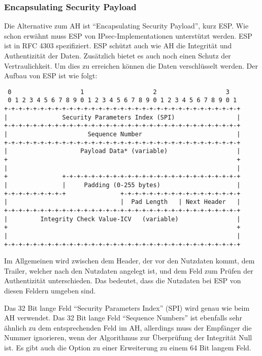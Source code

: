 \documentclass[12pt]{scrartcl}
\begin{document}
\subsubsection{Encapsulating Security Payload}
Die Alternative zum AH ist "`Encapsulating Security Payload"', kurz ESP. Wie schon erwähnt muss ESP von IPsec-Implementationen unterstützt werden. ESP ist in RFC 4303 spezifiziert.\cite{RFC4303}
ESP schützt auch wie AH die Integrität und Authentizität der Daten. Zusätzlich bietet es auch noch einen Schutz der Vertraulichkeit. Um dies zu erreichen können die Daten verschlüsselt werden. Der Aufbau von ESP ist wie folgt:

\begin{addmargin}[-1em]{0em}
\begin{verbatim}
 0                   1                   2                   3
 0 1 2 3 4 5 6 7 8 9 0 1 2 3 4 5 6 7 8 9 0 1 2 3 4 5 6 7 8 9 0 1
+-+-+-+-+-+-+-+-+-+-+-+-+-+-+-+-+-+-+-+-+-+-+-+-+-+-+-+-+-+-+-+-+ 
|               Security Parameters Index (SPI)                 | 
+-+-+-+-+-+-+-+-+-+-+-+-+-+-+-+-+-+-+-+-+-+-+-+-+-+-+-+-+-+-+-+-+ 
|                      Sequence Number                          | 
+-+-+-+-+-+-+-+-+-+-+-+-+-+-+-+-+-+-+-+-+-+-+-+-+-+-+-+-+-+-+-+-+ 
|                    Payload Data* (variable)                   | 
+                                                               + 
|                                                               | 
+               +-+-+-+-+-+-+-+-+-+-+-+-+-+-+-+-+-+-+-+-+-+-+-+-+
|               |     Padding (0-255 bytes)                     |
+-+-+-+-+-+-+-+-+               +-+-+-+-+-+-+-+-+-+-+-+-+-+-+-+-+
|                               |  Pad Length   | Next Header   |
+-+-+-+-+-+-+-+-+-+-+-+-+-+-+-+-+-+-+-+-+-+-+-+-+-+-+-+-+-+-+-+-+
|         Integrity Check Value-ICV   (variable)                |
+                                                               +
|                                                               |
+-+-+-+-+-+-+-+-+-+-+-+-+-+-+-+-+-+-+-+-+-+-+-+-+-+-+-+-+-+-+-+-+
\end{verbatim}
\end{addmargin}
Im Allgemeinen wird zwischen dem Header, der vor den Nutzdaten kommt, dem Trailer, welcher nach den Nutzdaten angelegt ist, und dem Feld zum Prüfen der Authentizität unterschieden. Das bedeutet, dass die Nutzdaten bei ESP von diesen Feldern umgeben sind.

Das 32 Bit lange Feld "`Security Parameters Index"' (SPI) wird genau wie beim AH verwendet. Das 32 Bit lange Feld "`Sequence Numbers"' ist ebenfalls sehr ähnlich zu dem entsprechenden Feld im AH, allerdings muss der Empfänger die Nummer ignorieren, wenn der Algorithmus zur Überprüfung der Integrität Null ist. Es gibt auch die Option zu einer Erweiterung zu einem 64 Bit langem Feld.
\end{document}
